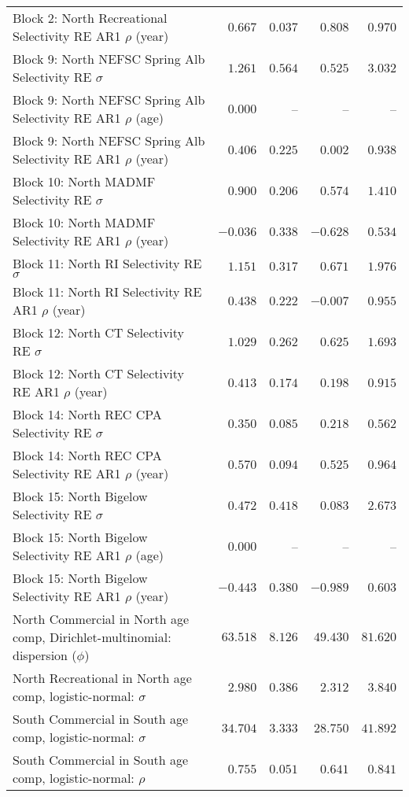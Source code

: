 \documentclass[
]{article}
\begin{document}
\begin{landscape}
\begin{longtable}[t]{lrrrr}
Block 2: North Recreational Selectivity RE AR1 $\rho$ (year) & $0.667$ & $0.037$ & $0.808$ & $0.970$\\
\addlinespace
Block 9: North NEFSC Spring Alb Selectivity RE $\sigma$ & $1.261$ & $0.564$ & $0.525$ & $3.032$\\
Block 9: North NEFSC Spring Alb Selectivity RE AR1 $\rho$ (age) & $0.000$ & -- & -- & --\\
Block 9: North NEFSC Spring Alb Selectivity RE AR1 $\rho$ (year) & $0.406$ & $0.225$ & $0.002$ & $0.938$\\
Block 10: North MADMF Selectivity RE $\sigma$ & $0.900$ & $0.206$ & $0.574$ & $1.410$\\
Block 10: North MADMF Selectivity RE AR1 $\rho$ (year) & $-0.036$ & $0.338$ & $-0.628$ & $0.534$\\
\addlinespace
Block 11: North RI Selectivity RE $\sigma$ & $1.151$ & $0.317$ & $0.671$ & $1.976$\\
Block 11: North RI Selectivity RE AR1 $\rho$ (year) & $0.438$ & $0.222$ & $-0.007$ & $0.955$\\
Block 12: North CT Selectivity RE $\sigma$ & $1.029$ & $0.262$ & $0.625$ & $1.693$\\
Block 12: North CT Selectivity RE AR1 $\rho$ (year) & $0.413$ & $0.174$ & $0.198$ & $0.915$\\
Block 14: North REC CPA Selectivity RE $\sigma$ & $0.350$ & $0.085$ & $0.218$ & $0.562$\\
\addlinespace
Block 14: North REC CPA Selectivity RE AR1 $\rho$ (year) & $0.570$ & $0.094$ & $0.525$ & $0.964$\\
Block 15: North Bigelow Selectivity RE $\sigma$ & $0.472$ & $0.418$ & $0.083$ & $2.673$\\
Block 15: North Bigelow Selectivity RE AR1 $\rho$ (age) & $0.000$ & -- & -- & --\\
Block 15: North Bigelow Selectivity RE AR1 $\rho$ (year) & $-0.443$ & $0.380$ & $-0.989$ & $0.603$\\
North Commercial in North age comp, Dirichlet-multinomial: dispersion ($\phi$) & $63.518$ & $8.126$ & $49.430$ & $81.620$\\
\addlinespace
North Recreational in North age comp, logistic-normal: $\sigma$ & $2.980$ & $0.386$ & $2.312$ & $3.840$\\
South Commercial in South age comp, logistic-normal: $\sigma$ & $34.704$ & $3.333$ & $28.750$ & $41.892$\\
South Commercial in South age comp, logistic-normal: $\rho$ & $0.755$ & $0.051$ & $0.641$ & $0.841$\\

\end{longtable}
\end{landscape}
\end{document}
